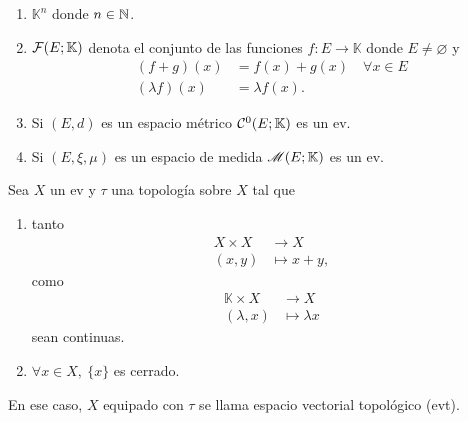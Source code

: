 \begin{eg}
	\begin{enumerate}
		\item $\mathbb{K}^{n}$ donde $n \in \mathbb{N}$.

		\item $\mathcal{F}(E; \mathbb{K})$ denota el conjunto de las funciones $f \colon E \to \mathbb{K}$ donde $E \neq \varnothing$ y
		\begin{align*}
			(f + g)(x) &= f(x) + g(x) \quad \forall x \in E \\
			(\lambda f)(x) &= \lambda f(x)
		.\end{align*}

		\item Si $(E,d)$ es un espacio métrico $\mathcal{C}^{0}(E; \mathbb{K})$ es un ev.

		\item Si $(E, \xi, \mu)$ es un espacio de medida $\mathscr{M}(E; \mathbb{K})$ es un ev.
	\end{enumerate}
\end{eg}

\begin{definition}
	Sea $X$ un ev y $\tau$ una topología sobre $X$ tal que
	\begin{enumerate}
		\item tanto
		\begin{align*}
			X \times X &\to X \\
			(x,y) &\mapsto x + y
		,\end{align*}
		como
		\begin{align*}
			\mathbb{K} \times X &\to X \\
			(\lambda,x) &\mapsto \lambda x
		\end{align*}
		sean continuas.

		\item $\forall x \in X,\ \{ x \}$ es cerrado.
	\end{enumerate}
	En ese caso, $X$ equipado con $\tau$ se llama espacio vectorial topológico (evt).
\end{definition}
